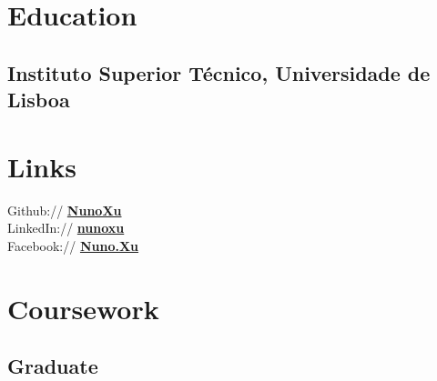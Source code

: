 \documentclass[letterpaper]{deedy-resume} %
\begin{document}
\begin{minipage}[t]{0.33\textwidth} %


\section{Education} 

\subsection{Instituto Superior Técnico, Universidade de Lisboa }


\sectionspace %


\sectionspace %



\section{Links} 

Github:// \href{https://github.com/NunoXu}{\bf NunoXu} \\
LinkedIn:// \href{https://www.linkedin.com/in/nunoxu}{\bf nunoxu}\\
Facebook:// \href{https://www.facebook.com/Nuno.Xu}{\bf Nuno.Xu}

\sectionspace %


\section{Coursework}

\subsection{Graduate}


\end{minipage}
\end{document}
